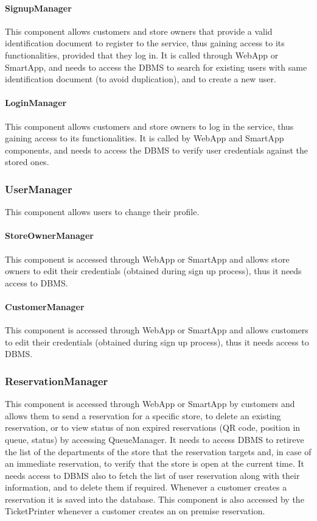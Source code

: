 \paragraph{SignupManager}
This component allows customers and store owners that provide a valid identification document to register to the service, thus gaining access to its functionalities, provided that they log in. It is called through WebApp or SmartApp, and needs to access the DBMS to search for existing users with same identification document (to avoid duplication), and to create a new user.
\paragraph{LoginManager}
This component allows customers and store owners to log in the service, thus gaining access to its functionalities. It is called by WebApp and SmartApp components, and needs to access the DBMS to verify user credentials against the stored ones.
\subsubsection{UserManager}
This component allows users to change their profile.
\paragraph{StoreOwnerManager}
This component is accessed through WebApp or SmartApp and allows store owners to edit their credentials (obtained during sign up process), thus it needs access to DBMS.
\paragraph{CustomerManager}
This component is accessed through WebApp or SmartApp and allows customers to edit their credentials (obtained during sign up process), thus it needs access to DBMS.
\subsubsection{ReservationManager}
This component is accessed through WebApp or SmartApp by customers and allows them to send a reservation for a specific store, to delete an existing reservation, or to view status of non expired reservations (QR code, position in queue, status) by accessing QueueManager. It needs to access DBMS to retireve the list of the departments of the store that the reservation targets and, in case of an immediate reservation, to verify that the store is open at the current time. It needs access to DBMS also to fetch the list of user reservation along with their information, and to delete them if required. Whenever a customer creates a reservation it is saved into the database. This component is also accessed by the TicketPrinter whenever a customer creates an on premise reservation.
